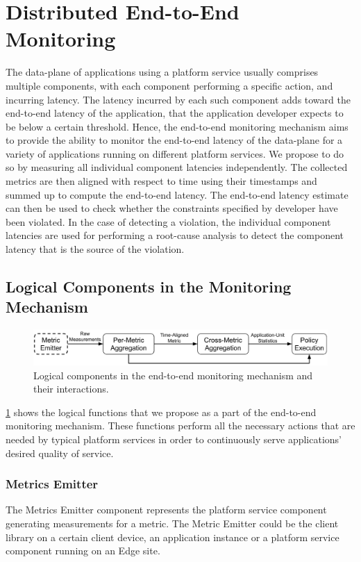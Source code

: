\section{Distributed End-to-End Monitoring}
The data-plane of applications using a platform service usually comprises multiple components, with each component performing a specific action, and incurring latency. The latency incurred by each such component adds toward the end-to-end latency of the application, that the application developer expects to be below a certain threshold. Hence, the end-to-end monitoring mechanism aims to provide the ability to monitor the end-to-end latency of the data-plane for a variety of applications running on different platform services. We propose to do so by measuring all individual component latencies independently. The collected metrics are then aligned with respect to time using their timestamps and summed up to compute the end-to-end latency. The end-to-end latency estimate can then be used to check whether the constraints specified by developer have been violated. In the case of detecting a violation, the individual component latencies are used for performing a root-cause analysis to detect the component latency that is the source of the violation.

\subsection{Logical Components in the Monitoring Mechanism}
\label{sec:monitoring_logical}
\begin{figure}
\centering
\includegraphics[width=\linewidth]{figures/design_space/monitoring/functions.pdf}
\caption{Logical components in the end-to-end monitoring mechanism and their interactions.}
\label{fig:monitoring_functions}
\end{figure}
\cref{fig:monitoring_functions} shows the logical functions that we propose as a part of the end-to-end monitoring mechanism. These functions perform all the necessary actions that are needed by typical platform services in order to continuously serve applications' desired quality of service.
\subsubsection{Metrics Emitter}
The Metrics Emitter component represents the platform service component generating measurements for a metric. The Metric Emitter could be the client library on a certain client device, an application instance or a platform service component running on an Edge site. 
